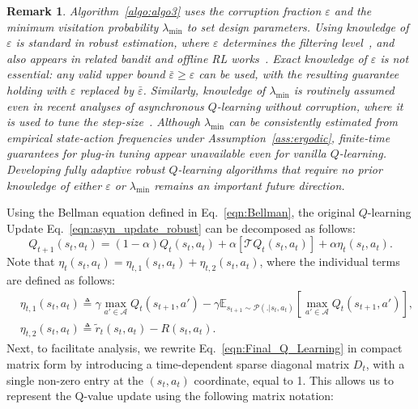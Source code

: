 \documentclass{article}
\newtheorem{remark}{Remark}
\begin{document}
\begin{remark}\label{rem:knowledge_parameters}
\emph{Algorithm~\ref{algo:algo3} uses the corruption fraction \(\varepsilon\) and the minimum visitation probability \(\lambda_{\min}\) to set design parameters. Using knowledge of $\varepsilon$
is standard in robust estimation, where \(\varepsilon\) determines the filtering level~\cite{lugosi,lugosi_new}, and also appears in related bandit and offline RL works~\cite{kapoor,crimed,zhang2022corruption}. Exact knowledge of \(\varepsilon\) is not essential: any valid upper bound \(\bar\varepsilon\ge \varepsilon\) can be used, with the resulting guarantee holding with \(\varepsilon\) replaced by \(\bar\varepsilon\). Similarly, knowledge of \(\lambda_{\min}\) is routinely assumed even in recent analyses of asynchronous \(Q\)-learning without corruption, where it is used to tune the step-size~\cite{Qu,li2024q}. Although \(\lambda_{\min}\) can be consistently estimated from empirical state-action frequencies under Assumption~\ref{ass:ergodic}, finite-time guarantees for plug-in tuning appear unavailable even for vanilla \(Q\)-learning. Developing fully adaptive robust \(Q\)-learning algorithms that require no prior knowledge of either \(\varepsilon\) or \(\lambda_{\min}\) remains an important future direction.}
\end{remark}
\iffalse
Using the Bellman equation defined in Eq.~\eqref{eqn:Bellman}, the original \(Q\)-learning Update Eq.~\eqref{eqn:asyn_update_robust} can be decomposed as follows:
\begin{equation}\label{eqn:Final_Q_Learning}
    Q_{t+1}(s_t, a_t) = (1 - \alpha)Q_t(s_t, a_t) + \alpha \left[\mathcal{T}Q_t(s_t, a_t)\right] + \alpha \eta_t(s_t,a_t).
\end{equation}
Note that \(\eta_t(s_t, a_t) = \eta_{t,1}(s_t, a_t) + \eta_{t,2}(s_t, a_t)\), where the individual terms are defined as follows:
\begin{equation}
\begin{aligned}\label{eqn:drift_params_1}
    & \eta_{t,1}(s_t, a_t) \triangleq \gamma \max_{a' \in \mathcal{A}} Q_t(s_{t+1}, a') - \gamma \mathbb{E}_{s_{t+1} \sim \mathcal{P}(.|s_t, a_t)}\left[ \max_{a' \in \mathcal{A}} Q_t(s_{t+1}, a') \right], \\
    & \eta_{t,2}(s_t, a_t) \triangleq \tilde{r}_t(s_t,a_t) - R(s_t, a_t). 
\end{aligned}
\end{equation}
Next, to facilitate analysis, we rewrite Eq.~\eqref{eqn:Final_Q_Learning} in compact matrix form by introducing a time-dependent sparse diagonal matrix \(D_t\), with a single non-zero entry at the \((s_t, a_t)\) coordinate, equal to 1. This allows us to represent the Q-value update using the following matrix notation:
\end{document}
